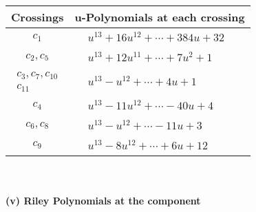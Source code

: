\documentclass[1p]{elsarticle_modified}
\theoremstyle{definition}
\begin{document}
\begin{tabular}{m{50pt}|m{274pt}}
Crossings & \hspace{64pt}u-Polynomials at each crossing \\
\hline $$\begin{aligned}c_{1}\end{aligned}$$&$\begin{aligned}
&u^{13}+16 u^{12}+\cdots+384 u+32
\end{aligned}$\\
\hline $$\begin{aligned}c_{2},c_{5}\end{aligned}$$&$\begin{aligned}
&u^{13}+12 u^{11}+\cdots+7 u^2+1
\end{aligned}$\\
\hline $$\begin{aligned}c_{3},c_{7},c_{10}\\c_{11}\end{aligned}$$&$\begin{aligned}
&u^{13}- u^{12}+\cdots+4 u+1
\end{aligned}$\\
\hline $$\begin{aligned}c_{4}\end{aligned}$$&$\begin{aligned}
&u^{13}-11 u^{12}+\cdots-40 u+4
\end{aligned}$\\
\hline $$\begin{aligned}c_{6},c_{8}\end{aligned}$$&$\begin{aligned}
&u^{13}- u^{12}+\cdots-11 u+3
\end{aligned}$\\
\hline $$\begin{aligned}c_{9}\end{aligned}$$&$\begin{aligned}
&u^{13}-8 u^{12}+\cdots+6 u+12
\end{aligned}$\\
\hline
\end{tabular}\\~\\
\newpage\renewcommand{\arraystretch}{1}
\flushleft \textbf{(v) Riley Polynomials at the component}\newline \\
\end{document}
